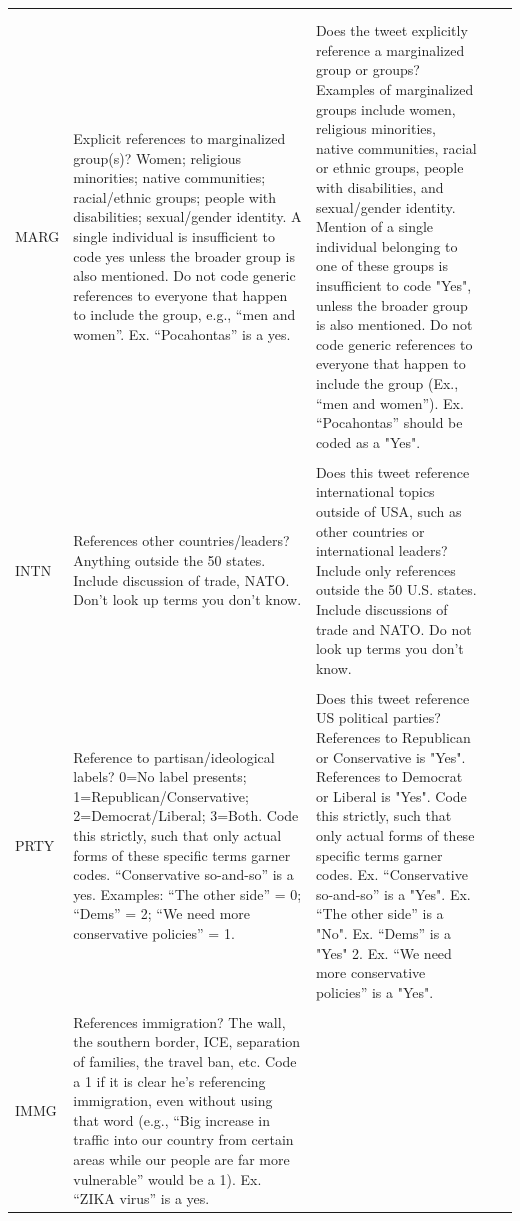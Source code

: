 \documentclass{article}
\begin{document}
\begin{longtable}{@{}lp{6cm}p{7cm}ll@{}}
   &
   \\ \\
MARG &
  Explicit references to marginalized group(s)?  Women; religious minorities; native   communities; racial/ethnic groups; people with disabilities; sexual/gender   identity.  A single individual is   insufficient to code yes unless the broader group is also mentioned.  Do not code generic references to everyone   that happen to include the group, e.g., “men and women”.  Ex. “Pocahontas” is a yes. &
  Does the tweet explicitly reference a marginalized group or   groups?  Examples of marginalized   groups include women, religious minorities, native communities, racial or   ethnic groups, people with disabilities, and sexual/gender identity.  Mention of a single individual belonging to   one of these groups is insufficient to code "Yes", unless the   broader group is also mentioned.  Do   not code generic references to everyone that happen to include the group   (Ex., “men and women”).  Ex.   “Pocahontas” should be coded as a "Yes". &
   &
   \\ \\
INTN &
  References other countries/leaders?  Anything outside the 50 states.  Include discussion of trade, NATO.  Don’t look up terms you don’t know. &
  Does this tweet reference international topics outside of USA,   such as other countries or international leaders?  Include only references outside the 50 U.S.   states.  Include discussions of trade   and NATO.  Do not look up terms you   don’t know. &
   &
   \\ \\
PRTY &
  Reference to partisan/ideological labels?  0=No label presents;   1=Republican/Conservative; 2=Democrat/Liberal; 3=Both.  Code this strictly, such that only actual   forms of these specific terms garner codes.    “Conservative so-and-so” is a yes.    Examples: “The other side” = 0; “Dems” = 2; “We need more conservative   policies” = 1. &
  Does this tweet reference US political parties?  References to Republican or Conservative is   "Yes". References to Democrat or Liberal is "Yes".  Code this strictly, such that only actual forms   of these specific terms garner codes. Ex. “Conservative so-and-so” is a   "Yes".  Ex. “The other side”   is a "No".  Ex. “Dems” is a   "Yes" 2. Ex. “We need more conservative policies” is a   "Yes". &
   &
   \\ \\
IMMG &
  References immigration?    The wall, the southern border, ICE, separation of families, the travel   ban, etc.  Code a 1 if it is clear he’s referencing immigration, even   without using that word (e.g., “Big increase in traffic into our country from   certain areas while our people are far more vulnerable” would be a 1).  Ex. “ZIKA virus” is a yes. &

\end{longtable}
\end{document}
